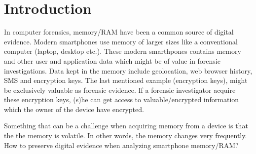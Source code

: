 \section{Introduction}
In computer forensics, memory/RAM have been a common source of digital evidence. 
Modern smartphones use memory of larger sizes like a conventional computer (laptop, desktop etc.).
These modern smarthpones contains memory and other user and application  data which
might be of value in forensic investigations.
Data kept in the memory include geolocation, web browser history, SMS and encryption keys.
The last mentioned example (encryption keys), might be exclusively valuable as forensic evidence.
If a forensic investigator acquire these encryption keys, (s)he can get access to valuable/encrypted
information which the owner of the device have encrypted.

Something that can be a challenge when acquiring memory from a device is that the the memory is volatile.
In other words, the memory changes very frequently. 
How to preserve digital evidence when analyzing smartphone memory/RAM?

%
%

